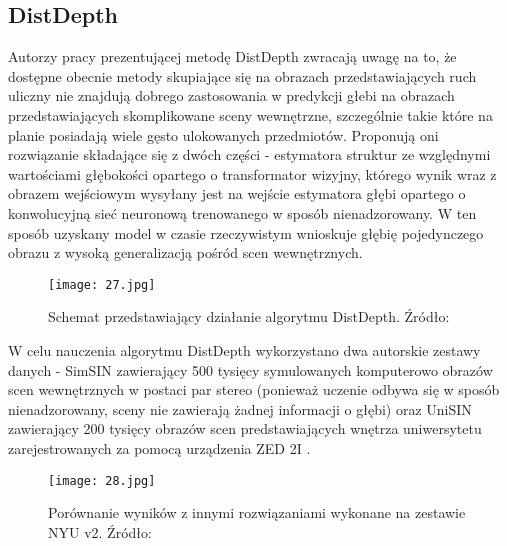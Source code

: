 \subsection{DistDepth}
Autorzy pracy prezentującej metodę DistDepth \cite{wu2022practical} zwracają uwagę na to, że dostępne obecnie metody skupiające się na obrazach przedstawiających ruch uliczny nie znajdują dobrego zastosowania w predykcji głebi na obrazach przedstawiających skomplikowane sceny wewnętrzne, szczególnie takie które na planie posiadają wiele gęsto ulokowanych przedmiotów. Proponują oni rozwiązanie składające się z dwóch części - estymatora struktur ze względnymi wartościami głębokości opartego o transformator wizyjny, którego wynik wraz z obrazem wejściowym wysyłany jest na wejście estymatora głębi opartego o konwolucyjną sieć neuronową trenowanego w sposób nienadzorowany. W ten sposób uzyskany model w czasie rzeczywistym wnioskuje głębię pojedynczego obrazu z wysoką generalizacją pośród scen wewnętrznych.
\begin{figure}[H]
    \centering
    \texttt{[image: 27.jpg]}
    \caption{Schemat przedstawiający działanie algorytmu DistDepth. Źródło: \cite{wu2022practical}}
    \label{fig:distdepth-teaser}
\end{figure}
W celu nauczenia algorytmu DistDepth wykorzystano dwa autorskie zestawy danych - SimSIN zawierający 500 tysięcy symulowanych komputerowo obrazów scen wewnętrznych w postaci par stereo (ponieważ uczenie odbywa się w sposób nienadzorowany, sceny nie zawierają żadnej informacji o głębi) oraz UniSIN zawierający 200 tysięcy obrazów scen predstawiających wnętrza uniwersytetu zarejestrowanych za pomocą urządzenia ZED 2I \cite{ZED2I}.
\begin{figure}[H]
    \centering
    \texttt{[image: 28.jpg]}
    \caption{Porównanie wyników z innymi rozwiązaniami wykonane na zestawie NYU v2. Źródło: \cite{wu2022practical}}
    \label{fig:distdepth-results}
\end{figure}


